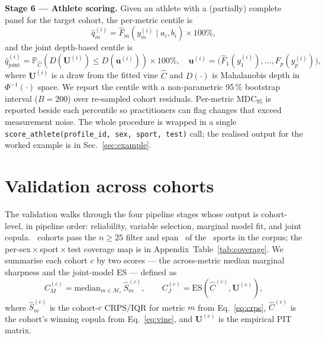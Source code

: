 \documentclass[10pt]{article}
\begin{document}
\textbf{Stage 6 --- Athlete scoring.}
Given an athlete with a (partially) complete panel for the target
cohort, the per-metric centile is
\begin{equation}
\widehat{q}_m^{(i)} =
\widehat{F}_m\!\left(y_m^{(i)} \mid a_i, b_i\right) \times 100\%,
\label{eq:qmarg}
\end{equation}
and the joint depth-based centile
\cite{mahalanobis1936generalized, liu1999depth} is
\begin{equation}
\widehat{q}_{\text{joint}}^{(i)} =
\mathbb{P}_{\widehat{C}}\!\left(D(\mathbf{U}^{(i)}) \leq D(\mathbf{u}^{(i)})\right) \times 100\%,
\quad \mathbf{u}^{(i)} = \big(\widehat{F}_1(y_1^{(i)}), \dots, \widehat{F}_p(y_p^{(i)})\big),
\label{eq:qjoint}
\end{equation}
where $\mathbf{U}^{(i)}$ is a draw from the fitted vine $\widehat{C}$
and $D(\cdot)$ is Mahalanobis depth in $\Phi^{-1}(\cdot)$ space. We
report the centile with a non-parametric 95\,\% bootstrap interval
($B{=}200$) over re-sampled cohort residuals. Per-metric MDC$_{95}$ is
reported beside each percentile so practitioners can flag changes that
exceed measurement noise. The whole procedure is wrapped in a single
\texttt{score\_athlete(profile\_id, sex, sport, test)} call; the
realised output for the worked example is in Sec.~\ref{sec:example}.

\FloatBarrier
\section{Validation across cohorts}
\label{sec:results}

The validation walks through the four pipeline stages whose output is
cohort-level, in pipeline order: reliability, variable selection,
marginal model fit, and joint copula. \Ncohorts{}~cohorts pass the
$n\!\geq\!25$ filter and span \NsportsCohort{}~of the
\Nsports{}~sports in the corpus; the per-sex\,$\times$\,sport\,$\times$\,test
coverage map is in Appendix~Table~\ref{tab:coverage}. We summarise
each cohort $c$ by two scores --- the across-metric median marginal
sharpness and the joint-model ES --- defined as
\begin{equation}
C_M^{(c)} = \mathrm{median}_{m \in \mathcal{M}_c}\,\widehat{S}_m^{(c)},
\qquad
C_J^{(c)} = \mathrm{ES}\!\left(\widehat{C}^{(c)}, \mathbf{U}^{(c)}\right),
\label{eq:cmcj}
\end{equation}
where $\widehat{S}_m^{(c)}$ is the cohort-$c$ CRPS$/$IQR for metric $m$
from Eq.~\eqref{eq:crps}, $\widehat{C}^{(c)}$ is the cohort's winning
copula from Eq.~\eqref{eq:vine}, and $\mathbf{U}^{(c)}$ is the
empirical PIT matrix.
\end{document}
